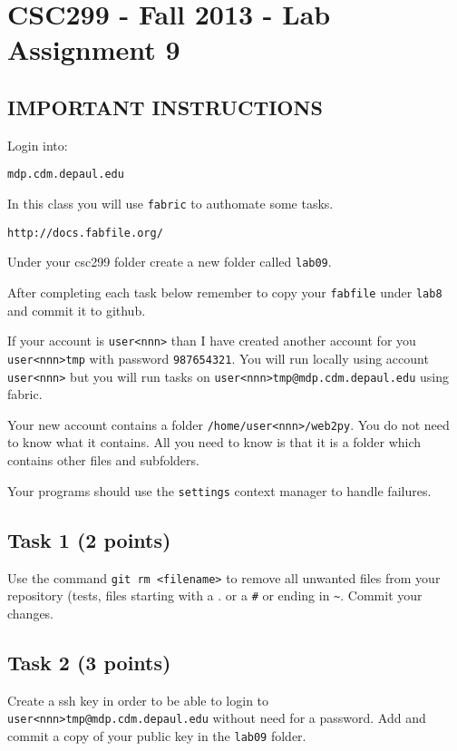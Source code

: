 \documentclass[12pt]{article}
\begin{document}
\section{CSC299 - Fall 2013 - Lab Assignment 9}

\subsection*{IMPORTANT INSTRUCTIONS}

\noindent Login into:
\begin{verbatim}
mdp.cdm.depaul.edu
\end{verbatim}

\noindent In this class you will use {\tt fabric} to authomate some tasks.
\begin{verbatim}
http://docs.fabfile.org/
\end{verbatim}

\noindent Under your csc299 folder create a new folder called {\tt lab09}.

\noindent After completing each task below remember to copy your {\tt fabfile} under {\tt lab8} and commit it to github.

\noindent If your account is {\tt user<nnn>} than I have created another account for you {\tt user<nnn>tmp} with password {\tt 987654321}. You will run locally using account {\tt user<nnn>} but you will run tasks on {\tt user<nnn>tmp@mdp.cdm.depaul.edu} using fabric. 

\noindent Your new account contains a folder {\tt /home/user<nnn>/web2py}. You do not need to know what it contains. All you need to know is that it is a folder which contains other files and subfolders.

\noindent Your programs should use the {\tt settings} context manager to handle failures.

\subsection{Task 1 (2 points)}

Use the command {\tt git rm <filename>} to remove all unwanted files from your repository (tests, files starting with a . or a \verb!#! or ending in \verb!~!. Commit your changes.

\subsection{Task 2 (3 points)}

Create a ssh key in order to be able to login to {\tt user<nnn>tmp@mdp.cdm.depaul.edu} without need for a password.
Add and commit a copy of your public key in the {\tt lab09} folder.
\end{document}
